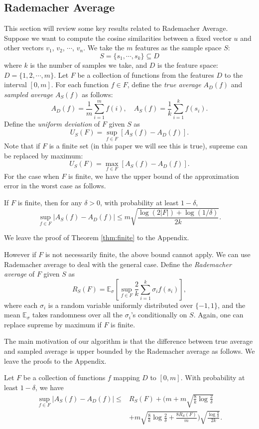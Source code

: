 \documentclass[sigconf,anonymous]{acmart}
\begin{document}
\subsection{Rademacher Average}
This section will review some key results related to Rademacher Average. 
Suppose we want to compute the cosine similarities between a fixed vector $u$ and other vectors $v_1$, $v_2$, $\cdots$, $v_n$. We take the $m$ features as the sample space $S$:
$$S = \{s_1, \cdots, s_k\} \subseteq D$$
where $k$ is the number of samples we take, and $D$ is the feature space: $D = \{1,2,\cdots,m\}$.
Let $F$ be a collection of functions from the features $D$ to the interval $[0, m]$.
For each function $f\in F$, define the \emph{true average} $A_D(f)$ and \emph{sampled average} $A_S(f)$ as follows:
$$A_D(f) = \frac{1}{m} \sum_{i=1}^m f(i),\quad A_S(f) = \frac{1}{k} \sum_{i=1}^k f(s_i).$$
Define the \emph{uniform deviation} \cite{Oneto13} of $F$ given $S$ as
$$U_S(F) = \sup_{f\in F} [ A_S(f) - A_D(f) ].$$
Note that if $F$ is a finite set (in this paper we will see this is true), supreme can be replaced by maximum:
$$U_S(F) = \max_{f\in F} [ A_S(f) - A_D(f) ].$$
For the case when $F$ is finite, we have the upper bound of the approximation error in the worst case as follows.
\begin{theorem}
\label{thm:finite}
If $F$ is finite, then for any $\delta > 0$, with probability at least $1-\delta$,
$$\sup_{f\in F} | A_S(f) - A_D(f) | \leq m\sqrt{\frac{\log(2|F|) + \log(1/\delta)}{2k}}.$$ 
\end{theorem}
We leave the proof of Theorem \ref{thm:finite} to the Appendix.

However if $F$ is not necessarily finite, the above bound cannot apply. We can use Rademacher average to deal with the general case. 
Define the \emph{Rademacher average} \cite{Mohri09,BM02,Oneto13} of $F$ given $S$ as
\newcommand{\E}{\mathbb{E}}
$$R_S(F) = \E_\sigma \left[\sup_{f\in F} \frac{2}{k}\sum_{i=1}^k \sigma_i f(s_i) \right],$$
where each $\sigma_i$ is a random variable uniformly distributed over $\{-1, 1\}$, and the mean $\E_\sigma$ takes randomness over all the $\sigma_i$'s conditionally on $S$. Again, one can replace supreme by maximum if $F$ is finite.

The main motivation of our algorithm is that the difference between true average and sampled average is upper bounded by the Rademacher average as follows.
We leave the proofs to the Appendix.

\begin{theorem}
\label{thm:main}
Let $F$ be a collection of functions $f$ mapping $D$ to $[0,m]$. 
With probability at least $1-\delta$, we have
$$\begin{aligned}
\sup_{f\in F}|A_S(f) - A_D(f)| \leq &R_S(F) + \bigg(m+m\sqrt{\frac{8}{k}\log \frac{2}{\delta}} \\&+ m\sqrt{\frac{8}{k}\log \frac{2}{\delta} + \frac{8R_S(F)}{m}}\bigg)\sqrt{\frac{\log \frac{8}{\delta}}{2k}}.
\end{aligned}$$
\end{theorem}
\end{document}
